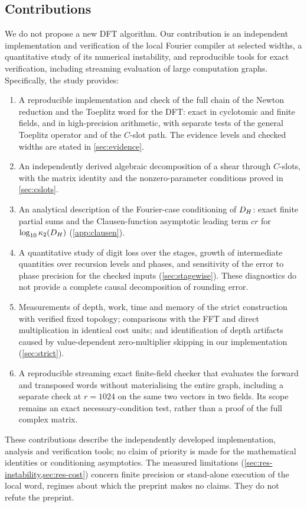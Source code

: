 \documentclass[11pt]{article}
\theoremstyle{plain}
\begin{document}
\subsection{Contributions}
We do not propose a new DFT algorithm. Our contribution is an independent implementation and verification of the local Fourier compiler at selected widths, a quantitative study of its numerical instability, and reproducible tools for exact verification, including streaming evaluation of large computation graphs. Specifically, the study provides:
\begin{enumerate}
\item[(a)] A reproducible implementation and check of the full chain of the Newton reduction and the Toeplitz word for the DFT: exact in cyclotomic and finite fields, and in high-precision arithmetic, with separate tests of the general Toeplitz operator and of the $C$-slot path. The evidence levels and checked widths are stated in \cref{sec:evidence}.
\item[(b)] An independently derived algebraic decomposition of a shear through $C$-slots, with the matrix identity and the nonzero-parameter conditions proved in \cref{sec:cslots}.
\item[(c)] An analytical description of the Fourier-case conditioning of $D_H$: exact finite partial sums and the Clausen-function asymptotic leading term $cr$ for $\log_{10}\kappa_2(D_H)$ (\cref{app:clausen}).
\item[(d)] A quantitative study of digit loss over the stages, growth of intermediate quantities over recursion levels and phases, and sensitivity of the error to phase precision for the checked inputs (\cref{sec:stagewise}). These diagnostics do not provide a complete causal decomposition of rounding error.
\item[(e)] Measurements of depth, work, time and memory of the strict construction with verified fixed topology; comparisons with the FFT and direct multiplication in identical cost units; and identification of depth artifacts caused by value-dependent zero-multiplier skipping in our implementation (\cref{sec:strict}).
\item[(f)] A reproducible streaming exact finite-field checker that evaluates the forward and transposed words without materialising the entire graph, including a separate check at $r=1024$ on the same two vectors in two fields. Its scope remains an exact necessary-condition test, rather than a proof of the full complex matrix.
\end{enumerate}
These contributions describe the independently developed implementation, analysis and verification tools; no claim of priority is made for the mathematical identities or conditioning asymptotics. The measured limitations (\cref{sec:res-instability,sec:res-cost}) concern finite precision or stand-alone execution of the local word, regimes about which the preprint makes no claims. They do not refute the preprint.
\end{document}

